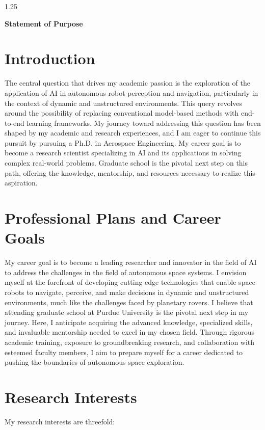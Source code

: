 \documentclass[a4paper,12pt]{article}
\begin{document}
\begin{spacing}{1.25}

\begin{center}
\Large\textbf{Statement of Purpose}
\end{center}

\section{Introduction}

The central question that drives my academic passion is the exploration of the application of AI in autonomous robot perception and navigation, particularly in the context of dynamic and unstructured environments. This query revolves around the possibility of replacing conventional model-based methods with end-to-end learning frameworks. My journey toward addressing this question has been shaped by my academic and research experiences, and I am eager to continue this pursuit by pursuing a Ph.D. in Aerospace Engineering. My career goal is to become a research scientist specializing in AI and its applications in solving complex real-world problems. Graduate school is the pivotal next step on this path, offering the knowledge, mentorship, and resources necessary to realize this aspiration.

\section{Professional Plans and Career Goals}
My career goal is to become a leading researcher and innovator in the field of AI to address the challenges in the field of autonomous space systems. I envision myself at the forefront of developing cutting-edge technologies that enable space robots to navigate, perceive, and make decisions in dynamic and unstructured environments, much like the challenges faced by planetary rovers. I believe that attending graduate school at Purdue University is the pivotal next step in my journey. Here, I anticipate acquiring the advanced knowledge, specialized skills, and invaluable mentorship needed to excel in my chosen field. Through rigorous academic training, exposure to groundbreaking research, and collaboration with esteemed faculty members, I aim to prepare myself for a career dedicated to pushing the boundaries of autonomous space exploration.

\section{Research Interests}
My research interests are threefold:


\end{spacing}
\end{document}
